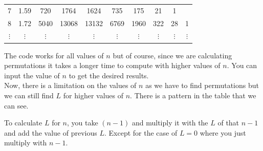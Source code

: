 \documentclass[a4paper]{exam}
\begin{document}
\begin{questions}
\begin{mdframed}
\begin{table}[H]
\begin{tabular}{c|c|c|c|c|c|c|c|c|c}
           7 & 1.59 & 720 & 1764 & 1624 & 735 & 175 & 21 & 1 \\
           8 & 1.72 & 5040 & 13068 & 13132 & 6769 & 1960 & 322 & 28 & 1\\
           $\vdots$ & $\vdots$ & $\vdots$ & $\vdots$ & $\vdots$ & $\vdots$ & $\vdots$ & $\vdots$ & $\vdots$ & $\vdots$\\
       \end{tabular}
   \end{table}
   The code works for all values of $n$ but of course, since we are calculating permutations it takes a longer time to compute with higher values of $n$. You can input the value of $n$ to get the desired results.\\
   Now, there is a limitation on the values of $n$ as we have to find permutations but we can still find $L$ for higher values of $n$. There is a pattern in the table that we can see. 
   
   To calculate $L$ for $n$, you take $(n - 1)$ and multiply it with the $L$ of that $n - 1$ and add the value of previous $L$.
   Except for the case of $L = 0$ where you just multiply with $n - 1$. 
   

\end{mdframed}
\end{questions}
\end{document}
